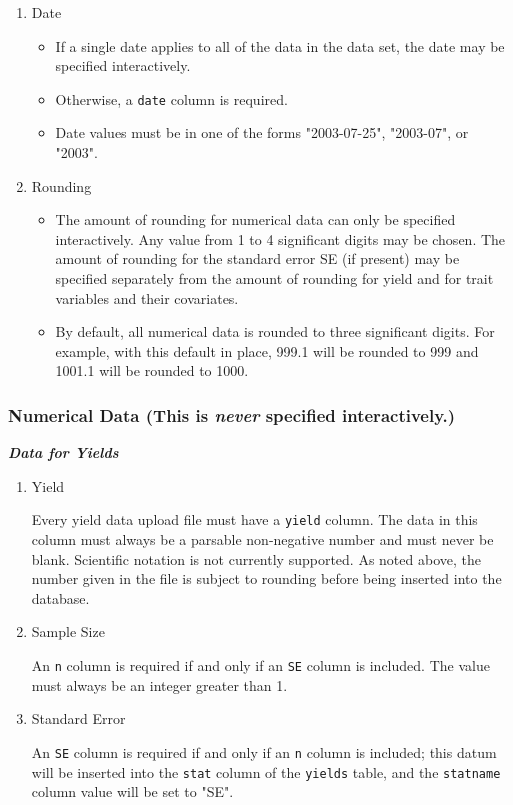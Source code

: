 \begin{enumerate}
\item Date

\begin{itemize}
 \item If a single date applies to all of the data in the data set, the date may be specified interactively.
 \item Otherwise, a \verb|date| column is required.
 \item Date values must be in one of the forms "2003-07-25", "2003-07", or "2003".
\end{itemize}

\item Rounding

\begin{itemize}
 \item The amount of rounding for numerical data can only be specified
   interactively.  Any value from 1 to 4 significant digits may be chosen.
   The amount of rounding for the standard error SE (if present) may be
   specified separately from the amount of rounding for yield and for trait
   variables and their covariates.
 \item By default, all numerical data is rounded to three significant digits.
   For example, with this default in place, 999.1 will be rounded to 999 and
   1001.1 will be rounded to 1000.
\end{itemize}

\end{enumerate}

\subsubsection{Numerical Data  (This is \textit{never} specified interactively.)}

\textbf{\textit{Data for Yields}}

\begin{enumerate}
\item Yield
  
  Every yield data upload file must have a \verb|yield| column.  The data in
   this column must always be a parsable non-negative number and must never
   be blank.  Scientific notation is not currently supported.  As noted
   above, the number given in the file is subject to rounding before being
   inserted into the database.
\item Sample Size
  
 An \verb|n| column is required if and only if an \verb|SE| column is included.  The value must always be an integer greater than 1.
\item Standard Error
  
   An \verb|SE| column is required if and only if an \verb|n| column is included;
    this datum will be inserted into the \verb|stat| column of the \verb|yields| table,
    and the \verb|statname| column value will be set to "SE".
\end{enumerate}

